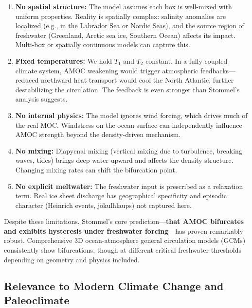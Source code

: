 \documentclass[12pt,letterpaper]{article}
\begin{document}
\begin{enumerate}

\item \textbf{No spatial structure:} The model assumes each box is well-mixed with uniform properties. Reality is spatially complex: salinity anomalies are localized (e.g., in the Labrador Sea or Nordic Seas), and the source region of freshwater (Greenland, Arctic sea ice, Southern Ocean) affects its impact. Multi-box or spatially continuous models can capture this.

\item \textbf{Fixed temperatures:} We hold $T_1$ and $T_2$ constant. In a fully coupled climate system, AMOC weakening would trigger atmospheric feedbacks---reduced northward heat transport would cool the North Atlantic, further destabilizing the circulation. The feedback is even stronger than Stommel's analysis suggests.

\item \textbf{No internal physics:} The model ignores wind forcing, which drives much of the real MOC. Windstress on the ocean surface can independently influence AMOC strength beyond the density-driven mechanism.

\item \textbf{No mixing:} Diapycnal mixing (vertical mixing due to turbulence, breaking waves, tides) brings deep water upward and affects the density structure. Changing mixing rates can shift the bifurcation point.

\item \textbf{No explicit meltwater:} The freshwater input is prescribed as a relaxation term. Real ice sheet discharge has geographical specificity and episodic character (Heinrich events, jökulhlaups) not captured here.

\end{enumerate}

Despite these limitations, Stommel's core prediction---\textbf{that AMOC bifurcates and exhibits hysteresis under freshwater forcing}---has proven remarkably robust. Comprehensive 3D ocean-atmosphere general circulation models (GCMs) consistently show bifurcations, though at different critical freshwater thresholds depending on geometry and physics included.

\subsection{Relevance to Modern Climate Change and Paleoclimate}
\end{document}
